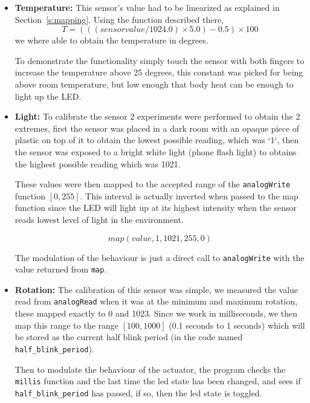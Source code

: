 \documentclass[10pt]{article}
\begin{document}
\begin{itemize}
    \item \textbf{Temperature:}
        This sensor's value had to be linearized as explained in
        Section~\ref{s:mapping}. Using the function described there,
        \[T = (((sensor value / 1024.0) \times 5.0) - 0.5) \times  100\]
        we where able to obtain the temperature in degrees.

        To demonstrate the functionality simply touch the sensor with both
        fingers to increase the temperature above 25 degrees, this constant was
        picked for being above room temperature, but low enough that body heat
        can be enough to light up the LED.

    \item \textbf{Light:}
        To calibrate the sensor 2 experiments were performed to obtain the 2
        extremes, first the sensor was placed in a dark room with an opaque piece
        of plastic on top of it to obtain the lowest possible reading, which was
        `1`, then the sensor was exposed to a bright white light (phone
        flash light) to obtains the highest possible reading which was 1021.

        These values were then mapped to the accepted range of the
        \texttt{analogWrite} function $[0, 255]$. This interval is actually
        inverted when passed to the map function since the LED will light up at
        its highest intensity when the sensor reads lowest level of light in the
        environment.

        \[map(value, 1, 1021, 255, 0)\]

        The modulation of the behaviour is just a direct call to
        \texttt{analogWrite} with the value returned from \texttt{map}.

    \item \textbf{Rotation:}
        The calibration of this sensor was simple, we measured the value read
        from \texttt{analogRead} when it was at the minimum and maximum
        rotation, these mapped exactly to 0 and 1023. Since we work in
        milliseconds, we then map this range to the range $[100, 1000]$ (0.1
        seconds to 1 seconds) which will be stored as the current half blink
        period (in the code named \texttt{half\_blink\_period}).

        Then to modulate the behaviour of the actuator, the program checks the
        \texttt{millis} function and the last time the led state has been
        changed, and sees if \texttt{half\_blink\_period} has passed, if so,
        then the led state is toggled.
\end{itemize}
\end{document}
